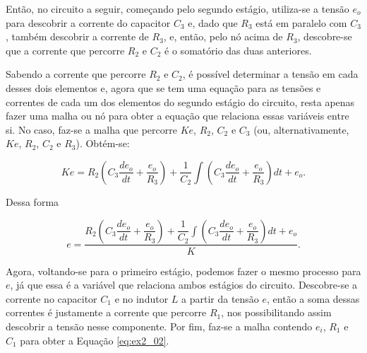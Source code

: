 \documentclass{article}
\numberwithin{equation}{section}
\begin{document}
\vspace{2mm}


Então, no circuito a seguir, começando pelo segundo estágio, utiliza-se a tensão $e_o$ para descobrir a corrente do capacitor $C_3$ e, dado que $R_3$ está em paralelo com $C_3$, também descobrir a corrente de $R_3$, e, então, pelo nó acima de $R_3$, descobre-se que a corrente que percorre $R_2$ e $C_2$ é o somatório das duas anteriores.


\begin{center}
\end{center}


\noindent Sabendo a corrente que percorre $R_2$ e $C_2$, é possível determinar a tensão em cada desses dois elementos e, agora que se tem uma equação para as tensões e correntes de cada um dos elementos do segundo estágio do circuito, resta apenas fazer uma malha ou nó para obter a equação que relaciona essas variáveis entre si. No caso, faz-se a malha que percorre $Ke$, $R_2$, $C_2$ e $C_3$ (ou, alternativamente, $Ke$, $R_2$, $C_2$ e $R_3$). Obtém-se:

\begin{equation*}
    Ke = R_2\left(C_3\dfrac{de_o}{dt} + \dfrac{e_o}{R_3}\right) + \dfrac{1}{C_2}\int\left(C_3\dfrac{de_o}{dt} + \dfrac{e_o}{R_3}\right)dt + e_o.
\end{equation*}

\noindent Dessa forma

\begin{equation}
    \label{eq:ex2_01}
    e = \dfrac{R_2\left(C_3\dfrac{de_o}{dt} + \dfrac{e_o}{R_3}\right) + \dfrac{1}{C_2}\displaystyle\int\left(C_3\dfrac{de_o}{dt} + \dfrac{e_o}{R_3}\right)dt + e_o}{K}.
\end{equation}

\vspace{1mm}

\noindent Agora, voltando-se para o primeiro estágio, podemos fazer o mesmo processo para $e$, já que essa é a variável que relaciona ambos estágios do circuito. Descobre-se a corrente no capacitor $C_1$ e no indutor $L$ a partir da tensão $e$, então a soma dessas correntes é justamente a corrente que percorre $R_1$, nos possibilitando assim descobrir a tensão nesse componente. Por fim, faz-se a malha contendo $e_i$, $R_1$ e $C_1$ para obter a Equação \eqref{eq:ex2_02}.
\end{document}
